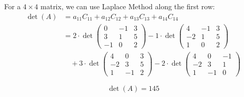 For a \(4 \times 4\) matrix, we can use Laplace Method along the first row:
\begin{align*}
\det(A) &= a_{11}C_{11} + a_{12}C_{12} + a_{13}C_{13} + a_{14}C_{14} \\
&= 2 \cdot \det\begin{pmatrix} 0 & -1 & 3 \\ 3 & 1 & 5 \\ -1 & 0 & 2 \end{pmatrix} 
- 1 \cdot \det\begin{pmatrix} 4 & -1 & 3 \\ -2 & 1 & 5 \\ 1 & 0 & 2 \end{pmatrix} \\
&\quad + 3 \cdot \det\begin{pmatrix} 4 & 0 & 3 \\ -2 & 3 & 5 \\ 1 & -1 & 2 \end{pmatrix} 
- 2 \cdot \det\begin{pmatrix} 4 & 0 & -1 \\ -2 & 3 & 1 \\ 1 & -1 & 0 \end{pmatrix}
\end{align*}

\[\det(A) = 145\]

\newpage